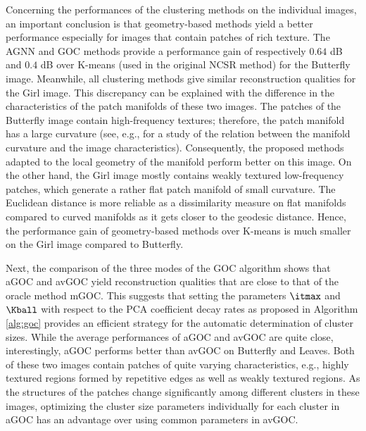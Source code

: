 \documentclass[journal]{IEEEtran}
\begin{document}
Concerning the performances of the clustering methods on the individual images, an important conclusion is that geometry-based methods yield a better performance especially for images that contain patches of rich texture. The AGNN and GOC methods provide a performance gain of respectively $0.64$ dB and $0.4$ dB over K-means (used in the original NCSR method) for the Butterfly image. Meanwhile, all clustering methods give similar reconstruction qualities for the Girl image. This discrepancy can be explained with the difference in the characteristics of the patch manifolds of these two images. The patches of the Butterfly image contain high-frequency textures; therefore,  the patch manifold has a large curvature (see, e.g., \cite{Vural10curvature} for a study of the relation between the manifold curvature and the image characteristics). Consequently, the proposed methods adapted to the local geometry of the manifold perform better on this image. On the other hand, the Girl image mostly contains weakly textured low-frequency patches, which generate a rather flat patch manifold of small curvature. The Euclidean distance is more reliable as a dissimilarity measure on flat manifolds compared to curved manifolds as it gets closer to the geodesic distance. Hence, the performance gain of geometry-based methods over K-means is much smaller on the Girl image compared to Butterfly.

Next, the comparison of the three modes of the GOC algorithm shows that aGOC and avGOC yield reconstruction qualities that are close to that of the oracle method mGOC. This suggests that setting the parameters $\itmax$ and $\Kball$ with respect to the PCA coefficient decay rates as proposed in Algorithm \ref{alg:goc} provides an efficient strategy for the automatic determination of cluster sizes. While the average performances of aGOC and avGOC are quite close, interestingly, aGOC performs better than avGOC on Butterfly and Leaves. Both of these two images contain patches of quite varying characteristics, e.g., highly textured regions formed by repetitive edges as well as weakly textured regions. As the structures of the patches change significantly among different clusters in these images, optimizing the cluster size parameters individually for each cluster in aGOC has an advantage over using common parameters in avGOC. %
\end{document}
